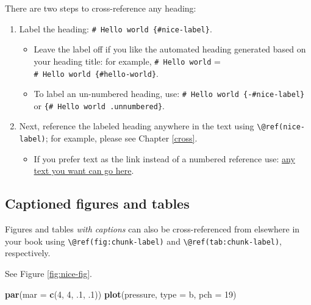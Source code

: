 \documentclass[
]{book}
\newenvironment{Shaded}{\begin{snugshade}}{\end{snugshade}}
\newcommand{\AttributeTok}[1]{\textcolor[rgb]{0.13,0.29,0.53}{#1}}
\newcommand{\DecValTok}[1]{\textcolor[rgb]{0.00,0.00,0.81}{#1}}
\newcommand{\FunctionTok}[1]{\textcolor[rgb]{0.13,0.29,0.53}{\textbf{#1}}}
\newcommand{\NormalTok}[1]{#1}
\newcommand{\StringTok}[1]{\textcolor[rgb]{0.31,0.60,0.02}{#1}}
\providecommand{\tightlist}{%
  \setlength{\itemsep}{0pt}\setlength{\parskip}{0pt}}
\theoremstyle{definition}
\theoremstyle{definition}
\theoremstyle{definition}
\theoremstyle{definition}
\theoremstyle{remark}
\begin{document}
There are two steps to cross-reference any heading:

\begin{enumerate}
\def\labelenumi{\arabic{enumi}.}
\tightlist
\item
  Label the heading: \texttt{\#\ Hello\ world\ \{\#nice-label\}}.

  \begin{itemize}
  \tightlist
  \item
    Leave the label off if you like the automated heading generated based on your heading title: for example, \texttt{\#\ Hello\ world} = \texttt{\#\ Hello\ world\ \{\#hello-world\}}.
  \item
    To label an un-numbered heading, use: \texttt{\#\ Hello\ world\ \{-\#nice-label\}} or \texttt{\{\#\ Hello\ world\ .unnumbered\}}.
  \end{itemize}
\item
  Next, reference the labeled heading anywhere in the text using \texttt{\textbackslash{}@ref(nice-label)}; for example, please see Chapter \ref{cross}.

  \begin{itemize}
  \tightlist
  \item
    If you prefer text as the link instead of a numbered reference use: \hyperref[cross]{any text you want can go here}.
  \end{itemize}
\end{enumerate}

\subsection{Captioned figures and tables}\label{captioned-figures-and-tables}

Figures and tables \emph{with captions} can also be cross-referenced from elsewhere in your book using \texttt{\textbackslash{}@ref(fig:chunk-label)} and \texttt{\textbackslash{}@ref(tab:chunk-label)}, respectively.

See Figure \ref{fig:nice-fig}.

\begin{Shaded}
\begin{Highlighting}[]
\FunctionTok{par}\NormalTok{(}\AttributeTok{mar =} \FunctionTok{c}\NormalTok{(}\DecValTok{4}\NormalTok{, }\DecValTok{4}\NormalTok{, .}\DecValTok{1}\NormalTok{, .}\DecValTok{1}\NormalTok{))}
\FunctionTok{plot}\NormalTok{(pressure, }\AttributeTok{type =} \StringTok{\textquotesingle{}b\textquotesingle{}}\NormalTok{, }\AttributeTok{pch =} \DecValTok{19}\NormalTok{)}
\end{Highlighting}
\end{Shaded}
\end{document}

